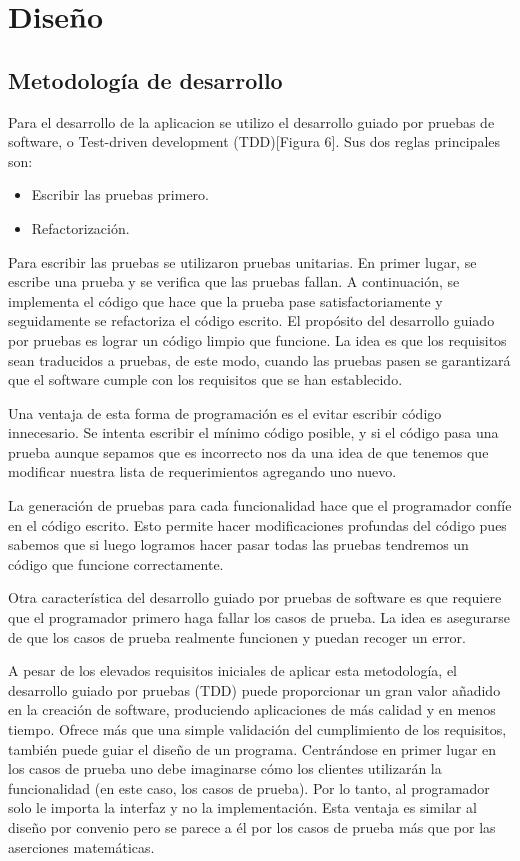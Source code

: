 \section{Diseño}
\label{section:diseno}

\subsection{Metodología de desarrollo}
\label{sec:metodologia_desarrollo}
Para el desarrollo de la aplicacion se utilizo el desarrollo guiado por pruebas de software, o Test-driven development (TDD)[Figura 6]. Sus dos reglas principales son:
\begin{itemize}
 \item Escribir las pruebas primero.
 \item Refactorización.
\end{itemize}

Para escribir las pruebas se utilizaron pruebas unitarias. En primer lugar, se escribe una prueba y se verifica que las pruebas fallan. A continuación, se implementa el código que hace que la prueba pase satisfactoriamente y seguidamente se refactoriza el código escrito. El propósito del desarrollo guiado por pruebas es lograr un código limpio que funcione. La idea es que los requisitos sean traducidos a pruebas, de este modo, cuando las pruebas pasen se garantizará que el software cumple con los requisitos que se han establecido.

Una ventaja de esta forma de programación es el evitar escribir código innecesario. Se intenta escribir el mínimo código posible, y si el código pasa una prueba aunque sepamos que es incorrecto nos da una idea de que tenemos que modificar nuestra lista de requerimientos agregando uno nuevo.

La generación de pruebas para cada funcionalidad hace que el programador confíe en el código escrito. Esto permite hacer modificaciones profundas del código pues sabemos que si luego logramos hacer pasar todas las pruebas tendremos un código que funcione correctamente.

Otra característica del desarrollo guiado por pruebas de software es que requiere que el programador primero haga fallar los casos de prueba. La idea es asegurarse de que los casos de prueba realmente funcionen y puedan recoger un error.

A pesar de los elevados requisitos iniciales de aplicar esta metodología, el desarrollo guiado por pruebas (TDD) puede proporcionar un gran valor añadido en la creación de software, produciendo aplicaciones de más calidad y en menos tiempo. Ofrece más que una simple validación del cumplimiento de los requisitos, también puede guiar el diseño de un programa. Centrándose en primer lugar en los casos de prueba uno debe imaginarse cómo los clientes utilizarán la funcionalidad (en este caso, los casos de prueba). Por lo tanto, al programador solo le importa la interfaz y no la implementación. Esta ventaja es similar al diseño por convenio pero se parece a él por los casos de prueba más que por las aserciones matemáticas.


